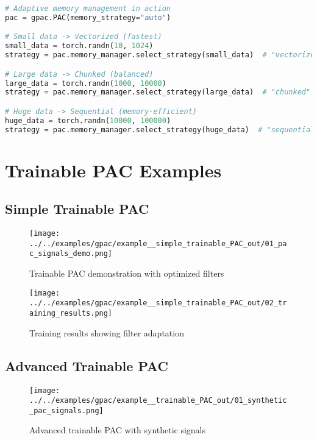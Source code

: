 \documentclass[11pt,a4paper]{article}
\begin{document}
\begin{lstlisting}[language=Python]
# Adaptive memory management in action
pac = gpac.PAC(memory_strategy="auto")

# Small data -> Vectorized (fastest)
small_data = torch.randn(10, 1024)
strategy = pac.memory_manager.select_strategy(small_data)  # "vectorized"

# Large data -> Chunked (balanced)
large_data = torch.randn(1000, 10000)
strategy = pac.memory_manager.select_strategy(large_data)  # "chunked"

# Huge data -> Sequential (memory-efficient)
huge_data = torch.randn(10000, 100000)
strategy = pac.memory_manager.select_strategy(huge_data)  # "sequential"
\end{lstlisting}

\section{Trainable PAC Examples}

\subsection{Simple Trainable PAC}

\begin{figure}[H]
\centering
\texttt{[image: ../../examples/gpac/example\_\_simple\_trainable\_PAC\_out/01\_pac\_signals\_demo.png]}
\caption{Trainable PAC demonstration with optimized filters}
\label{fig:trainable-simple}
\end{figure}

\begin{figure}[H]
\centering
\texttt{[image: ../../examples/gpac/example\_\_simple\_trainable\_PAC\_out/02\_training\_results.png]}
\caption{Training results showing filter adaptation}
\label{fig:training-results}
\end{figure}

\subsection{Advanced Trainable PAC}

\begin{figure}[H]
\centering
\texttt{[image: ../../examples/gpac/example\_\_trainable\_PAC\_out/01\_synthetic\_pac\_signals.png]}
\caption{Advanced trainable PAC with synthetic signals}
\label{fig:trainable-advanced}
\end{figure}
\end{document}

